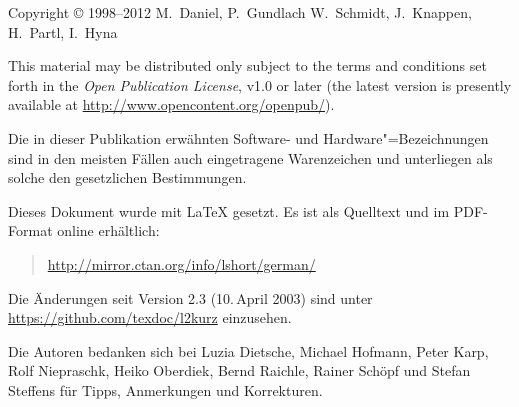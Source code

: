 {\parindent=0cm\thispagestyle{empty}

Copyright \copyright{} 1998--2012 M.~Daniel, P.~Gundlach W.~Schmidt, J.~Knappen, H.~Partl, I.~Hyna

\bigskip

{
This material may be distributed only subject to the terms and
conditions set forth in the \emph{Open Publication License}, v1.0 or
later (the latest version is presently available at
\url{http://www.opencontent.org/openpub/}).}


\bigskip

Die in dieser Publikation erwähnten Software- und Hardware"=Bezeichnungen sind
in den meisten Fällen auch eingetragene Warenzeichen und unterliegen als
solche den gesetzlichen Bestimmungen.

\bigskip

\vfill

Dieses Dokument wurde mit \LaTeX{} gesetzt.
Es ist als Quelltext und im PDF-Format online erhältlich:
\begin{quote}
\url{http://mirror.ctan.org/info/lshort/german/}
\end{quote}
Die Änderungen seit Version 2.3 (10.\,April 2003) sind unter \url{https://github.com/texdoc/l2kurz} einzusehen.
\bigskip

Die Autoren bedanken sich bei
Luzia Dietsche, 
Michael Hofmann, 
Peter Karp,
Rolf \mbox{Niepraschk},
Heiko Oberdiek,
Bernd Raichle, 
Rainer Schöpf und
Stefan Steffens
für Tipps, Anmerkungen und  Korrekturen.

}
